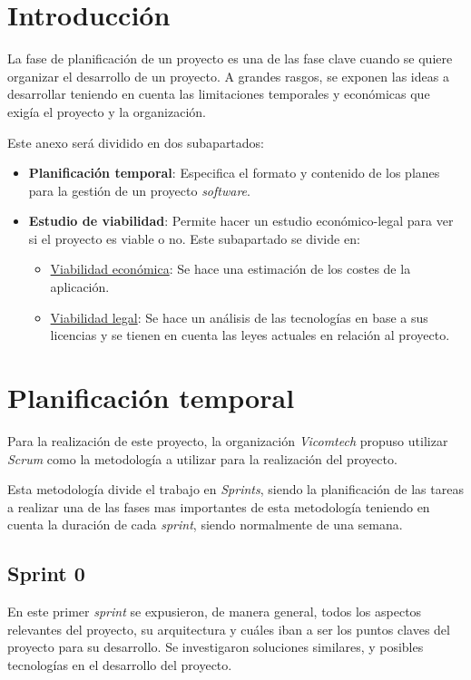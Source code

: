 \section{Introducción}
La fase de planificación de un proyecto es una de las fase clave cuando se quiere organizar el desarrollo de un proyecto. A grandes rasgos, se exponen las ideas a desarrollar teniendo en cuenta las limitaciones temporales y económicas que exigía el proyecto y la organización.

Este anexo será dividido en dos subapartados:
\begin{itemize}
  \item \textbf{Planificación temporal}: Especifica el formato y contenido de los planes para la gestión de un proyecto \textit{software}.
  \item \textbf{Estudio de viabilidad}: Permite hacer un estudio económico-legal para ver si el proyecto es viable o no. Este subapartado se divide en:
    \begin{itemize}
        \item \underline{Viabilidad económica}: Se hace una estimación de los costes de la aplicación.
        \item \underline{Viabilidad legal}: Se hace un análisis de las tecnologías en base a sus licencias y se tienen en cuenta las leyes actuales en relación al proyecto.
    \end{itemize}
\end{itemize}

\section{Planificación temporal}

Para la realización de este proyecto, la organización \textit{Vicomtech} propuso utilizar \textit{Scrum} como la metodología a utilizar para la realización del proyecto.

Esta metodología divide el trabajo en \textit{Sprints}, siendo la planificación de las tareas a realizar una de las fases mas importantes de esta metodología teniendo en cuenta la duración de cada \textit{sprint}, siendo normalmente de una semana.

\subsection{Sprint 0}

En este primer \textit{sprint} se expusieron, de manera general, todos los aspectos relevantes del proyecto, su arquitectura y cuáles iban a ser los puntos claves del proyecto para su desarrollo. Se investigaron soluciones similares, y posibles tecnologías en el desarrollo del proyecto. 

